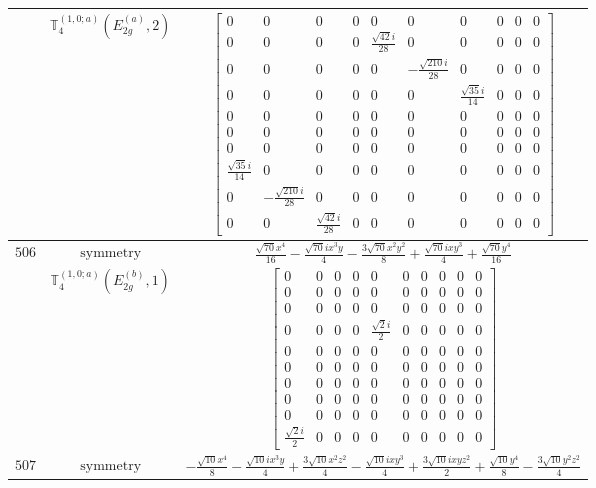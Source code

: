 \documentclass[fleqn,8pt,landscape]{jsarticle}
\begin{document}
\begin{longtable}{ccc}
$  $ & $ \mathbb{T}_{4}^{(1,0;a)}(E_{2g}^{(a)},2) $ & $ \begin{bmatrix} 0 & 0 & 0 & 0 & 0 & 0 & 0 & 0 & 0 & 0 \\ 0 & 0 & 0 & 0 & \frac{\sqrt{42} i}{28} & 0 & 0 & 0 & 0 & 0 \\ 0 & 0 & 0 & 0 & 0 & - \frac{\sqrt{210} i}{28} & 0 & 0 & 0 & 0 \\ 0 & 0 & 0 & 0 & 0 & 0 & \frac{\sqrt{35} i}{14} & 0 & 0 & 0 \\ 0 & 0 & 0 & 0 & 0 & 0 & 0 & 0 & 0 & 0 \\ 0 & 0 & 0 & 0 & 0 & 0 & 0 & 0 & 0 & 0 \\ 0 & 0 & 0 & 0 & 0 & 0 & 0 & 0 & 0 & 0 \\ \frac{\sqrt{35} i}{14} & 0 & 0 & 0 & 0 & 0 & 0 & 0 & 0 & 0 \\ 0 & - \frac{\sqrt{210} i}{28} & 0 & 0 & 0 & 0 & 0 & 0 & 0 & 0 \\ 0 & 0 & \frac{\sqrt{42} i}{28} & 0 & 0 & 0 & 0 & 0 & 0 & 0 \end{bmatrix} $ \\ \hline
$ 506 $ & $ \text{symmetry} $ & $ \frac{\sqrt{70} x^{4}}{16} - \frac{\sqrt{70} i x^{3} y}{4} - \frac{3 \sqrt{70} x^{2} y^{2}}{8} + \frac{\sqrt{70} i x y^{3}}{4} + \frac{\sqrt{70} y^{4}}{16} $ \\
$  $ & $ \mathbb{T}_{4}^{(1,0;a)}(E_{2g}^{(b)},1) $ & $ \begin{bmatrix} 0 & 0 & 0 & 0 & 0 & 0 & 0 & 0 & 0 & 0 \\ 0 & 0 & 0 & 0 & 0 & 0 & 0 & 0 & 0 & 0 \\ 0 & 0 & 0 & 0 & 0 & 0 & 0 & 0 & 0 & 0 \\ 0 & 0 & 0 & 0 & \frac{\sqrt{2} i}{2} & 0 & 0 & 0 & 0 & 0 \\ 0 & 0 & 0 & 0 & 0 & 0 & 0 & 0 & 0 & 0 \\ 0 & 0 & 0 & 0 & 0 & 0 & 0 & 0 & 0 & 0 \\ 0 & 0 & 0 & 0 & 0 & 0 & 0 & 0 & 0 & 0 \\ 0 & 0 & 0 & 0 & 0 & 0 & 0 & 0 & 0 & 0 \\ 0 & 0 & 0 & 0 & 0 & 0 & 0 & 0 & 0 & 0 \\ \frac{\sqrt{2} i}{2} & 0 & 0 & 0 & 0 & 0 & 0 & 0 & 0 & 0 \end{bmatrix} $ \\ \hline
$ 507 $ & $ \text{symmetry} $ & $ - \frac{\sqrt{10} x^{4}}{8} - \frac{\sqrt{10} i x^{3} y}{4} + \frac{3 \sqrt{10} x^{2} z^{2}}{4} - \frac{\sqrt{10} i x y^{3}}{4} + \frac{3 \sqrt{10} i x y z^{2}}{2} + \frac{\sqrt{10} y^{4}}{8} - \frac{3 \sqrt{10} y^{2} z^{2}}{4} $ \\

\end{longtable}
\end{document}
